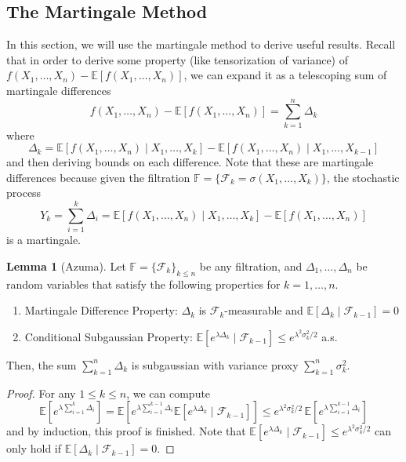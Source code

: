 \documentclass{article}
\theoremstyle{definition}
\newtheorem{lemma}[theorem]{Lemma}
\theoremstyle{remark}
\theoremstyle{definition}
\begin{document}
\subsection{The Martingale Method}

In this section, we will use the martingale method to derive useful results. Recall that in order to derive some property (like tensorization of variance) of $f(X_1, \ldots, X_n) - \mathbb{E}[f(X_1, \ldots, X_n)]$, we can expand it as a telescoping sum of martingale differences 
\[f(X_1, \ldots, X_n) - \mathbb{E}[f(X_1, \ldots, X_n)] = \sum_{k=1}^n \Delta_k\]
where 
\[\Delta_k = \mathbb{E}[f(X_1, \ldots, X_n) \mid X_1, \ldots, X_k] - \mathbb{E}[f(X_1, \ldots, X_n) \mid X_1, \ldots, X_{k-1}]\]
and then deriving bounds on each difference. Note that these are martingale differences because given the filtration $\mathbb{F} = \{\mathcal{F}_k = \sigma(X_1, \ldots, X_k)\}$, the stochastic process
\[Y_k = \sum_{i=1}^k \Delta_i = \mathbb{E}[f(X_1, \ldots, X_n) \mid X_1, \ldots, X_k] - \mathbb{E}[f(X_1, \ldots, X_n)]\]
is a martingale. 

\begin{lemma}[Azuma]
Let $\mathbb{F} = \{\mathcal{F}_k\}_{k \leq n}$ be any filtration, and $\Delta_1, \ldots, \Delta_n$ be random variables that satisfy the following properties for $k = 1, \ldots, n$. 
\begin{enumerate}
    \item Martingale Difference Property: $\Delta_k$ is $\mathcal{F}_k$-measurable and $\mathbb{E}[\Delta_k \mid \mathcal{F}_{k-1}] = 0$ 
    \item Conditional Subgaussian Property: $\mathbb{E}[e^{\lambda \Delta_k} \mid \mathcal{F}_{k-1}] \leq e^{\lambda^2 \sigma^2_k / 2}$ a.s. 
\end{enumerate}
Then, the sum $\sum_{k=1}^n \Delta_k$ is subgaussian with variance proxy $\sum_{k=1}^n \sigma_k^2$. 
\end{lemma}
\begin{proof}
For any $1 \leq k \leq n$, we can compute 
\[\mathbb{E}[ e^{\lambda \sum_{i=1}^k \Delta_i} ] = \mathbb{E}[e^{\lambda \sum_{i=1}^{k-1} \Delta_i} \mathbb{E}[e^{\lambda \Delta_k} \mid \mathcal{F}_{k-1}]] \leq e^{\lambda^2 \sigma_k^2 / 2} \, \mathbb{E}[e^{\lambda \sum_{i=1}^{k-1} \Delta_i}]\]
and by induction, this proof is finished. Note that $\mathbb{E}[e^{\lambda \Delta_k} \mid \mathcal{F}_{k-1}] \leq e^{\lambda^2 \sigma^2_k / 2}$ can only hold if $\mathbb{E}[\Delta_k \mid \mathcal{F}_{k-1}] = 0$. 
\end{proof}
\end{document}
